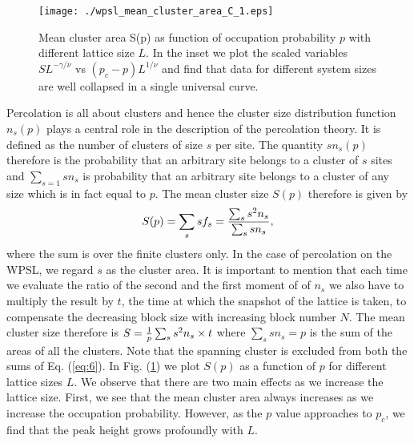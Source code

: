 ﻿\documentclass[twocolumn,showpacs,preprintnumbers,amsmath,amssymb]{revtex4}
\begin{document}
\begin{figure}
\label{fig4}
\texttt{[image: ./wpsl\_mean\_cluster\_area\_C\_1.eps]}
\caption{Mean cluster area S(p) as function of occupation probability $p$ with different lattice size $L$. In the
inset we plot the scaled variables $SL^{-\gamma/\nu}$ vs $(p_c-p)L^{1/\nu}$ and find that data for different system sizes are
well collapsed in a single universal curve.
\label{fig4}
}
\end{figure}


Percolation is all about clusters and hence the cluster size distribution function $n_s(p)$ plays a central
role in the description of the percolation theory.  It is defined as the number of clusters of size $s$ per site.
The quantity $sn_s(p)$ therefore is the probability that an arbitrary site belongs to a cluster of $s$ sites 
and $\sum_{s=1} sn_s$ is probability that an arbitrary site belongs to a cluster of any size which is in fact equal to
$p$.
The mean cluster size $S(p)$ therefore is given by
\begin{equation}
\label{eq:6}
S(p)=\sum_s sf_s={{\sum_s s^2n_s}\over{\sum_s sn_s}},
\end{equation}
where the sum is over the finite clusters only. In the case of percolation on the WPSL, we regard $s$ as
the cluster area. It is important to mention that each time we evaluate the ratio of the second and the first moment of
of $n_s$ we also have to multiply the result by $t$, the time at which the snapshot of the lattice is taken, to compensate the decreasing block size with increasing block number $N$. 
The mean cluster size therefore is
$S={{1}\over{p}}\sum_s s^2n_s \times t$ where $\sum_s sn_s=p$ is the sum of the areas of all the clusters. Note that the spanning cluster is excluded 
from both the sums of Eq. (\ref{eq:6}). 
In Fig. (\ref{fig4}) we plot $S(p)$ as a function of $p$ for different lattice sizes $L$. We observe that there are two main effects as we
increase the lattice size. First, we see that the mean cluster area
always increases as we increase the occupation probability. However, as the $p$ value approaches to $p_c$, we find
that the peak height grows profoundly with $L$. 
\end{document}
